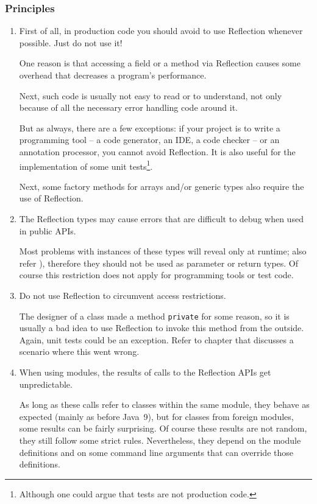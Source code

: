 
\subsubsection{Principles}
\begin{enumerate}[label=P\arabic*.]
\item{First of all, in production code you should avoid to use Reflection whenever possible. Just do not use it!

One reason is that accessing a field or a method via Reflection causes some overhead that decreases a program’s performance. 

Next, such code is usually not easy to read or to understand, not only because of all the necessary error handling code around it.

But as always, there are a few exceptions: if your project is to write a programming tool – a code generator, an IDE, a code checker – or an annotation processor, you cannot avoid Reflection. It is also useful for the implementation of some unit tests\footnote{Although one could argue that tests are not production code.}.

Next, some factory methods for arrays and/or generic types also require the use of Reflection.}

\item{The Reflection types may cause errors that are difficult to debug when used in public APIs.

Most problems with instances of these types will reveal only at runtime; also refer ), therefore they should not be used as parameter or return types. Of course this restriction does not apply for programming tools or test code.}

\item{Do not use Reflection to circumvent access restrictions.

The designer of a class made a method \lstinline|private| for some reason, so it is usually a bad idea to use Reflection to invoke this method from the outside. Again, unit tests could be an exception. Refer to chapter  that discusses a scenario where this went wrong.}

\item{When using modules\autocite{OPENJDK:ProjectJigsaw}, the results of calls to the Reflection APIs get unpredictable.

As long as these calls refer to classes within the same module, they behave as expected (mainly as before Java~9), but for classes from foreign modules, some results can be fairly surprising. Of course these results are not random, they still follow some strict rules. Nevertheless, they depend on the module definitions and on some command line arguments that can override those definitions.}
\end{enumerate}

